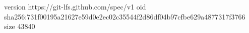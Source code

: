 version https://git-lfs.github.com/spec/v1
oid sha256:731f00195a21627e59d0e2ec02c35544f2d86df04b97cfbe629a4877317f3766
size 43840
